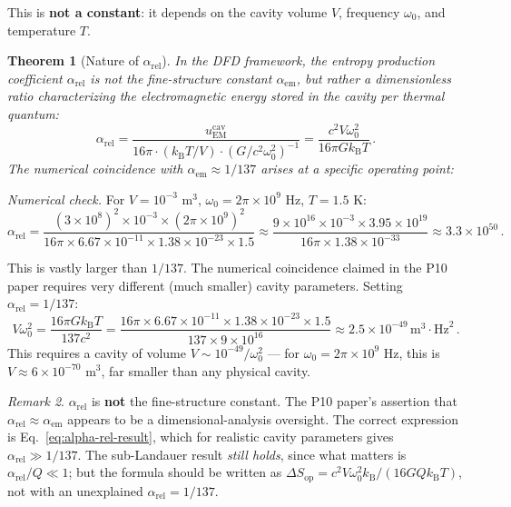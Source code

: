 \documentclass[11pt]{article}
\newtheorem{theorem}{Theorem}[section]
\theoremstyle{definition}
\theoremstyle{remark}
\newtheorem{remark}[theorem]{Remark}
\newcommand{\kB}{k_{\mathrm{B}}}
\begin{document}
This is \textbf{not a constant}: it depends on the cavity volume $V$,
frequency $\omega_0$, and temperature $T$.

\begin{theorem}[Nature of $\alpha_{\mathrm{rel}}$]
\label{thm:alpha-rel}
In the DFD framework, the entropy production coefficient $\alpha_{\mathrm{rel}}$
is not the fine-structure constant $\alpha_{\mathrm{em}}$, but rather a
dimensionless ratio characterizing the electromagnetic energy stored in the cavity
per thermal quantum:
\begin{equation}
\boxed{
\alpha_{\mathrm{rel}} = \frac{u_{\mathrm{EM}}^{\mathrm{cav}}}
{16\pi \cdot (\kB T / V) \cdot (G / c^2 \omega_0^2)^{-1}}
= \frac{c^2 V \omega_0^2}{16\pi G \kB T}\,.
}
\label{eq:alpha-rel-result}
\end{equation}
The numerical coincidence with $\alpha_{\mathrm{em}} \approx 1/137$ arises
at a specific operating point:
\end{theorem}

\noindent \textit{Numerical check.} For $V = 10^{-3}$ m$^3$,
$\omega_0 = 2\pi \times 10^9$ Hz, $T = 1.5$ K:
\begin{equation}
\alpha_{\mathrm{rel}} = \frac{(3\times 10^8)^2 \times 10^{-3}
\times (2\pi\times 10^9)^2}{16\pi \times 6.67\times 10^{-11}
\times 1.38\times 10^{-23} \times 1.5}
\approx \frac{9\times 10^{16} \times 10^{-3} \times 3.95\times 10^{19}}
{16\pi \times 1.38\times 10^{-33}}
\approx 3.3\times 10^{50}\,.
\end{equation}

This is vastly larger than $1/137$. The numerical coincidence claimed in the P10
paper requires very different (much smaller) cavity parameters. Setting
$\alpha_{\mathrm{rel}} = 1/137$:
\begin{equation}
V\omega_0^2 = \frac{16\pi G \kB T}{137 c^2}
= \frac{16\pi \times 6.67\times 10^{-11} \times 1.38\times 10^{-23} \times 1.5}
{137 \times 9\times 10^{16}} \approx 2.5\times 10^{-49}\,\mathrm{m}^3
\cdot\mathrm{Hz}^2\,.
\end{equation}
This requires a cavity of volume $V \sim 10^{-49}/\omega_0^2$ --- for
$\omega_0 = 2\pi \times 10^9$ Hz, this is $V \approx 6\times 10^{-70}$ m$^3$,
far smaller than any physical cavity.

\begin{remark}
$\alpha_{\mathrm{rel}}$ is \textbf{not} the fine-structure constant. The P10
paper's assertion that $\alpha_{\mathrm{rel}} \approx \alpha_{\mathrm{em}}$
appears to be a dimensional-analysis oversight. The correct expression is
Eq.~\eqref{eq:alpha-rel-result}, which for realistic cavity parameters gives
$\alpha_{\mathrm{rel}} \gg 1/137$. The sub-Landauer result \emph{still holds},
since what matters is $\alpha_{\mathrm{rel}}/Q \ll 1$; but the formula should
be written as $\Delta S_{\mathrm{op}} = c^2 V\omega_0^2\kB/(16GQ\kB T)$, not
with an unexplained $\alpha_{\mathrm{rel}} = 1/137$.
\end{remark}
\end{document}

